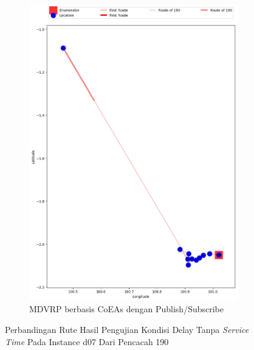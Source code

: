\begin{figure}[H]\ContinuedFloat
	\centering
	\begin{subfigure}[t]{\textwidth}
		\centering
		\includegraphics[width=\textwidth]{Resources/Images/delayed_7/real_m15_n100_delayed_7_190_pubsub_coes}
		\caption{MDVRP berbasis CoEAs dengan Publish/Subscribe}
		\label{fig:real_m15_n100_delayed_7_190_pubsub_coes}
	\end{subfigure}
	\caption{Perbandingan Rute Hasil Pengujian Kondisi Delay Tanpa \textit{Service Time} Pada Instance d07 Dari Pencacah 190}
	\label{fig:real_m15_n100_delayed_7_190_contd}
\end{figure}



